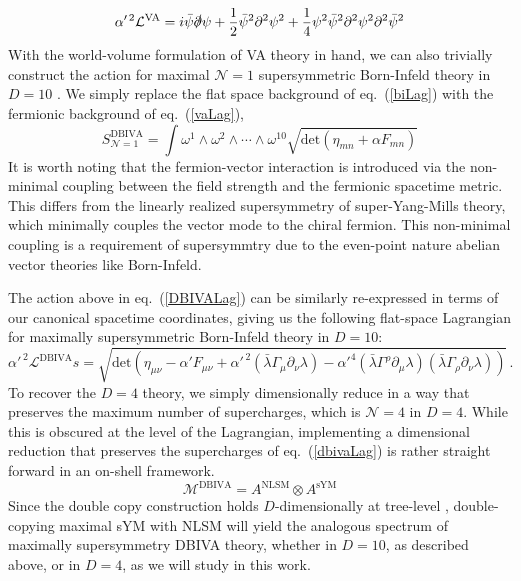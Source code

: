 \documentclass[11pt,letter]{article}
\def\eqn#1{eq.~(\ref{#1})}
\begin{document}
 \begin{equation}
   \alpha'^{\,2}\mathcal{L}^{\text{VA}} = i\bar{\psi}\slashed{\partial}\psi +\frac{1}{2} \bar{\psi}^2 \partial^2 \psi^2 + \frac{1}{4}\psi^2\bar{\psi}^2 \partial^2 \psi^2\partial^2 \bar{\psi}^2
 \end{equation}
With the world-volume formulation of VA theory in hand, we can also trivially construct the action for maximal $\mathcal{N}=1$ supersymmetric Born-Infeld theory in $D=10$ \cite{Tseytlin:1999dj,Bergshoeff:2013pia}. We simply replace the flat space background of \eqn{biLag} with the fermionic background of \eqn{vaLag},
\begin{equation}
 \label{DBIVALag}
S^{\text{DBIVA}}_{\mathcal{N}=1} = \int \omega^1 \wedge\omega^2 \wedge \cdots \wedge \omega^{10} \sqrt{\text{det}(\eta_{mn}+ \alpha F_{mn})}
\end{equation}
It is worth noting that the fermion-vector interaction is introduced via the {non-minimal} coupling between the field strength and the fermionic spacetime metric. This differs from the linearly realized supersymmetry of super-Yang-Mills theory, which minimally couples the vector mode to the chiral fermion. This non-minimal coupling is a requirement of supersymmtry due to the even-point nature abelian vector theories like Born-Infeld.

The action above in \eqn{DBIVALag} can be similarly re-expressed in terms of our canonical spacetime coordinates, giving us the following flat-space Lagrangian for maximally supersymmetric Born-Infeld theory in $D=10$: 
\begin{equation}
 \label{dbivaLag}
    \alpha'^{\,2}\mathcal{L}^{\text{DBIVA}}s = \sqrt{\text{det} \left(\eta_{\mu\nu}- \alpha' F_{\mu\nu} + \alpha'^{\,2} (\bar{\lambda} \Gamma_\mu \partial_\nu \lambda)- \alpha'^4(\bar{\lambda} \Gamma^\rho \partial_\mu \lambda )(\bar{\lambda} \Gamma_\rho \partial_\nu \lambda) \right)}
  \,.
\end{equation}
To recover the $D=4$ theory, we simply dimensionally reduce in a way that preserves the maximum number of supercharges, which is $\mathcal{N}=4$ in $D=4$. While this is obscured at the level of the Lagrangian, implementing a dimensional reduction that preserves the supercharges of \eqn{dbivaLag} is rather straight forward in an on-shell framework. 
\begin{equation}
\mathcal{M}^{\text{DBIVA}} = A^{\text{NLSM}} \otimes A^{\text{sYM}}
\end{equation}
Since the double copy construction holds $D$-dimensionally at tree-level \cite{BCJreview}, double-copying maximal sYM with NLSM will yield the analogous spectrum of maximally supersymmetry DBIVA theory, whether in $D=10$, as described above, or in $D=4$, as we will study in this work. 
\end{document}
